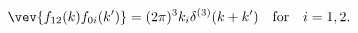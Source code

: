 \begin{equation}
  \vev{ f_{12}(k) f_{0i}(k') }
  = (2\pi)^3 k_i \delta^{(3)}(k+k') \quad {\rm for} \quad i=1,2.
\label{commutative-two-point}
\end{equation}

